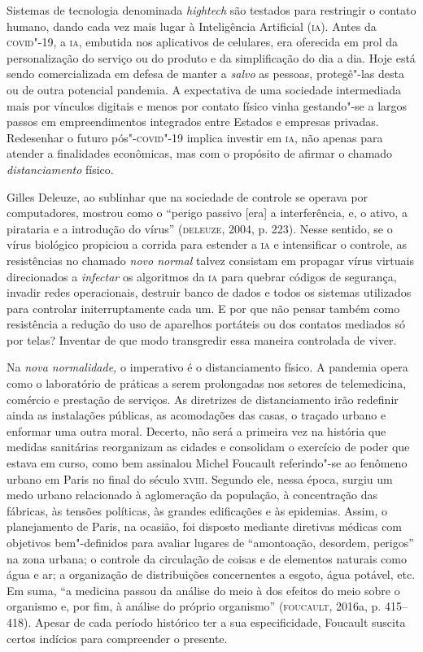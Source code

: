 Sistemas de tecnologia denominada \emph{hightech} são testados para
restringir o contato humano, dando cada vez mais lugar à Inteligência
Artificial (\textsc{ia}). Antes da \textsc{covid}"-19, a \textsc{ia}, embutida nos aplicativos de
celulares, era oferecida em prol da personalização do serviço ou do
produto e da simplificação do dia a dia. Hoje está sendo comercializada
em defesa de manter a \emph{salvo} as pessoas, protegê"-las desta ou de
outra potencial pandemia. A expectativa de uma sociedade intermediada
mais por vínculos digitais e menos por contato físico vinha gestando"-se
a largos passos em empreendimentos integrados entre Estados e empresas
privadas. Redesenhar o futuro pós"-\textsc{covid}"-19 implica investir em \textsc{ia}, não
apenas para atender a finalidades econômicas, mas com o propósito de
afirmar o chamado \emph{distanciamento} físico.

Gilles Deleuze, ao sublinhar que na sociedade de controle se operava por
computadores, mostrou como o ``perigo passivo {[}era{]} a interferência,
e, o ativo, a pirataria e a introdução do vírus'' (\textsc{deleuze}, 2004, p.
223). Nesse sentido, se o vírus biológico propiciou a corrida para
estender a \textsc{ia} e intensificar o controle, as resistências no chamado
\emph{novo normal} talvez consistam em propagar vírus virtuais
direcionados a \emph{infectar} os algoritmos da \textsc{ia} para quebrar códigos
de segurança, invadir redes operacionais, destruir banco de dados e
todos os sistemas utilizados para controlar initerruptamente cada um. E
por que não pensar também como resistência a redução do uso de aparelhos
portáteis ou dos contatos mediados só por telas? Inventar de que modo
transgredir essa maneira controlada de viver.

Na \emph{nova normalidade,} o imperativo é o distanciamento físico. A
pandemia opera como o laboratório de práticas a serem prolongadas nos
setores de telemedicina, comércio e prestação de serviços. As diretrizes
de distanciamento irão redefinir ainda as instalações públicas, as
acomodações das casas, o traçado urbano e enformar uma outra moral.
Decerto, não será a primeira vez na história que medidas sanitárias
reorganizam as cidades e consolidam o exercício de poder que estava em
curso, como bem assinalou Michel Foucault referindo"-se ao fenômeno
urbano em Paris no final do século \textsc{xviii}. Segundo ele, nessa época,
surgiu um medo urbano relacionado à aglomeração da população, à
concentração das fábricas, às tensões políticas, às grandes edificações
e às epidemias. Assim, o planejamento de Paris, na ocasião, foi disposto
mediante diretivas médicas com objetivos bem"-definidos para avaliar
lugares de ``amontoação, desordem, perigos'' na zona urbana; o controle
da circulação de coisas e de elementos naturais como água e ar; a
organização de distribuições concernentes a esgoto, água potável, etc.
Em suma, ``a medicina passou da análise do meio à dos efeitos do meio
sobre o organismo e, por fim, à análise do próprio organismo''
(\textsc{foucault}, 2016a, p. 415--418). Apesar de cada período histórico ter a
sua especificidade, Foucault suscita certos indícios para compreender o
presente.

